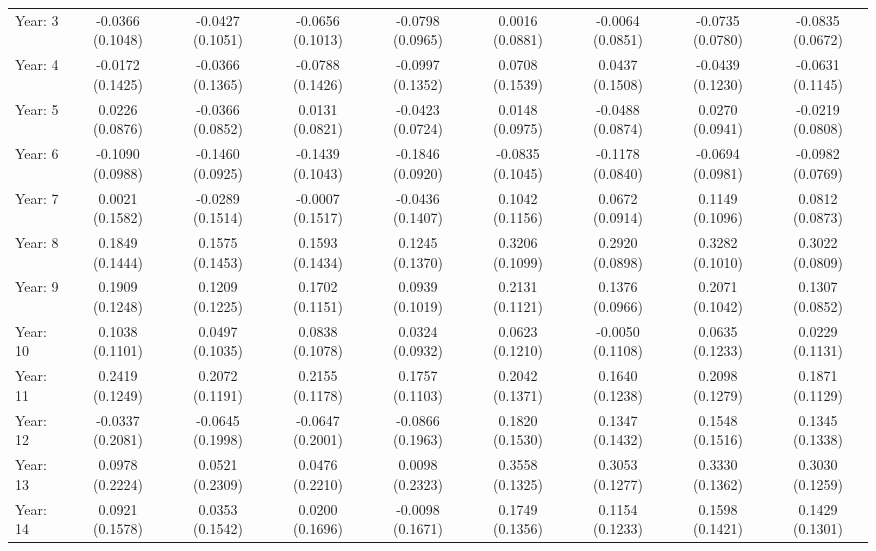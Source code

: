 \begin{tabular}{lcccccccc}
   Year: 3                             & -0.0366 (0.1048) & -0.0427 (0.1051) & -0.0656 (0.1013) & -0.0798 (0.0965) & 0.0016 (0.0881)  & -0.0064 (0.0851) & -0.0735 (0.0780) & -0.0835 (0.0672)\\   
   Year: 4                             & -0.0172 (0.1425) & -0.0366 (0.1365) & -0.0788 (0.1426) & -0.0997 (0.1352) & 0.0708 (0.1539)  & 0.0437 (0.1508)  & -0.0439 (0.1230) & -0.0631 (0.1145)\\   
   Year: 5                             & 0.0226 (0.0876)  & -0.0366 (0.0852) & 0.0131 (0.0821)  & -0.0423 (0.0724) & 0.0148 (0.0975)  & -0.0488 (0.0874) & 0.0270 (0.0941)  & -0.0219 (0.0808)\\   
   Year: 6                             & -0.1090 (0.0988) & -0.1460 (0.0925) & -0.1439 (0.1043) & -0.1846 (0.0920) & -0.0835 (0.1045) & -0.1178 (0.0840) & -0.0694 (0.0981) & -0.0982 (0.0769)\\   
   Year: 7                             & 0.0021 (0.1582)  & -0.0289 (0.1514) & -0.0007 (0.1517) & -0.0436 (0.1407) & 0.1042 (0.1156)  & 0.0672 (0.0914)  & 0.1149 (0.1096)  & 0.0812 (0.0873)\\   
   Year: 8                             & 0.1849 (0.1444)  & 0.1575 (0.1453)  & 0.1593 (0.1434)  & 0.1245 (0.1370)  & 0.3206 (0.1099)  & 0.2920 (0.0898)  & 0.3282 (0.1010)  & 0.3022 (0.0809)\\   
   Year: 9                             & 0.1909 (0.1248)  & 0.1209 (0.1225)  & 0.1702 (0.1151)  & 0.0939 (0.1019)  & 0.2131 (0.1121)  & 0.1376 (0.0966)  & 0.2071 (0.1042)  & 0.1307 (0.0852)\\   
   Year: 10                            & 0.1038 (0.1101)  & 0.0497 (0.1035)  & 0.0838 (0.1078)  & 0.0324 (0.0932)  & 0.0623 (0.1210)  & -0.0050 (0.1108) & 0.0635 (0.1233)  & 0.0229 (0.1131)\\   
   Year: 11                            & 0.2419 (0.1249)  & 0.2072 (0.1191)  & 0.2155 (0.1178)  & 0.1757 (0.1103)  & 0.2042 (0.1371)  & 0.1640 (0.1238)  & 0.2098 (0.1279)  & 0.1871 (0.1129)\\   
   Year: 12                            & -0.0337 (0.2081) & -0.0645 (0.1998) & -0.0647 (0.2001) & -0.0866 (0.1963) & 0.1820 (0.1530)  & 0.1347 (0.1432)  & 0.1548 (0.1516)  & 0.1345 (0.1338)\\   
   Year: 13                            & 0.0978 (0.2224)  & 0.0521 (0.2309)  & 0.0476 (0.2210)  & 0.0098 (0.2323)  & 0.3558 (0.1325)  & 0.3053 (0.1277)  & 0.3330 (0.1362)  & 0.3030 (0.1259)\\   
   Year: 14                            & 0.0921 (0.1578)  & 0.0353 (0.1542)  & 0.0200 (0.1696)  & -0.0098 (0.1671) & 0.1749 (0.1356)  & 0.1154 (0.1233)  & 0.1598 (0.1421)  & 0.1429 (0.1301)\\   

\end{tabular}
